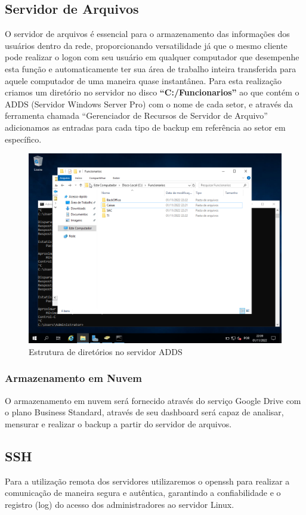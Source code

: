 \documentclass[12pt]{article}
\begin{document}
\subsection{Servidor de Arquivos}
O servidor de arquivos é essencial para o armazenamento das informações dos usuários dentro da rede, proporcionando versatilidade já que o mesmo cliente pode realizar o logon com seu usuário em qualquer computador que desempenhe esta função e automaticamente ter sua área de trabalho inteira transferida para aquele computador de uma maneira quase instantânea. Para esta realização criamos um diretório no servidor no disco \textbf{“C:/Funcionarios”} ao que contém o ADDS (Servidor Windows Server Pro) com o nome de cada setor, e através da ferramenta chamada “Gerenciador de Recursos de Servidor de Arquivo” adicionamos as entradas para cada tipo de backup em referência ao setor em específico.
\begin{figure}[ht]
\centering
\includegraphics[height=0.5\textwidth]{adds-pasta-compartilhada.png}
\caption{Estrutura de diretórios no servidor ADDS}
\label{fig:adds-pastas}
\end{figure}
\subsubsection{Armazenamento em Nuvem}
O armazenamento em nuvem será fornecido através do serviço Google Drive  com o plano Business Standard, através de seu dashboard será capaz de analisar, mensurar e realizar o backup a partir do servidor de arquivos.
\subsection{SSH}
Para a utilização remota dos servidores utilizaremos o openssh para realizar a comunicação de maneira segura e autêntica, garantindo a confiabilidade e o registro (log) do acesso dos administradores ao servidor Linux.
\end{document}
